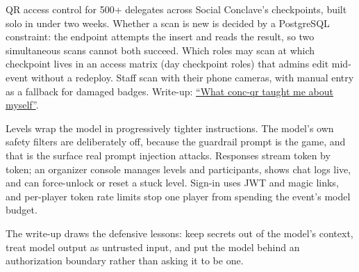 QR access control for 500+ delegates across Social Conclave's checkpoints, built solo in under two
weeks. Whether a scan is new is decided by a PostgreSQL 
constraint: the endpoint attempts the insert and reads the result, so two simultaneous scans cannot
both succeed. Which roles may scan at which checkpoint lives in an access matrix (day \arr
checkpoint \arr roles) that admins edit mid-event without a redeploy. Staff scan with their phone
cameras, with manual entry as a fallback for damaged badges. Write-up:
\href{https://jkartik.in/blog/what-conc-qr-taught-me-about-myself/}{``What conc-qr taught me about myself''}.


\begin{facts}
\end{facts}

 Levels wrap the model in progressively tighter instructions. The model's own safety
filters are deliberately off, because the guardrail prompt is the game, and that is the surface real
prompt injection attacks. Responses stream token by token; an organizer console manages levels and
participants, shows chat logs live, and can force-unlock or reset a stuck level. Sign-in uses JWT
and magic links, and per-player token rate limits stop one player from spending the event's model
budget.

 The write-up draws the defensive lessons: keep secrets out of the model's
context, treat model output as untrusted input, and put the model behind an authorization boundary
rather than asking it to be one.



